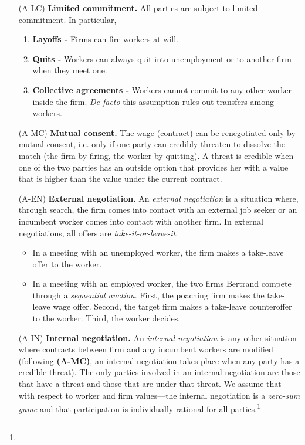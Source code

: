 \begin{enumerate}
\item[(A-LC)] \textbf{Limited commitment.} All parties are subject to limited commitment. In particular,
\begin{enumerate}
\item \textbf{Layoffs - } Firms can fire workers at will.
\item \textbf{Quits -} Workers can always quit into unemployment or to another firm when they meet one.
\item \textbf{Collective agreements -} Workers cannot commit to any other worker inside the firm. \emph{De facto} this assumption rules out transfers among workers.
\end{enumerate}
\item[(A-MC)] \textbf{Mutual consent.} The wage (contract) can be renegotiated only by mutual consent, i.e. only if one party can credibly threaten to dissolve the match (the firm by firing, the worker by quitting). A threat is credible
when one of the two parties has an outside option that provides her with a value that is higher than the value under the current contract.
\item[(A-EN)] \textbf{External negotiation.} An \textit{external negotiation} is a situation where, through search, the firm comes into contact with an external job seeker or an incumbent worker comes into contact with another firm. In external negotiations, all offers are \emph{take-it-or-leave-it}.
\begin{itemize}
\item In a meeting with an unemployed worker, the firm makes a take-leave offer to the worker.
\item In a meeting with an employed worker, the two firms Bertrand compete through a \textit{sequential auction}. First, the poaching firm makes the take-leave wage offer. Second, the target firm makes a take-leave counteroffer to the worker. Third, the worker decides.
\end{itemize}
\item[(A-IN)] \textbf{Internal negotiation.}
    An \emph{internal negotiation} is any other situation where contracts between firm and any incumbent workers are modified (following \textbf{(A-MC)}, an internal negotiation takes place when any party has a credible threat).
    The only parties involved in an internal negotiation are those that have a threat and those that are under that threat.
    We assume that---with respect to worker and firm values---the internal negotiation is a \emph{zero-sum game} and that participation is individually rational for all parties.\footnote{
}
\end{enumerate}
